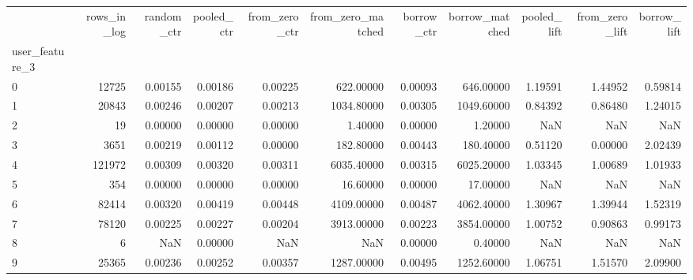 \begin{tabular}{lrrrrrrrrrr}
\toprule
 & rows\_in\_log & random\_ctr & pooled\_ctr & from\_zero\_ctr & from\_zero\_matched & borrow\_ctr & borrow\_matched & pooled\_lift & from\_zero\_lift & borrow\_lift \\
user\_feature\_3 &  &  &  &  &  &  &  &  &  &  \\
\midrule
0 & 12725 & 0.00155 & 0.00186 & 0.00225 & 622.00000 & 0.00093 & 646.00000 & 1.19591 & 1.44952 & 0.59814 \\
1 & 20843 & 0.00246 & 0.00207 & 0.00213 & 1034.80000 & 0.00305 & 1049.60000 & 0.84392 & 0.86480 & 1.24015 \\
2 & 19 & 0.00000 & 0.00000 & 0.00000 & 1.40000 & 0.00000 & 1.20000 & NaN & NaN & NaN \\
3 & 3651 & 0.00219 & 0.00112 & 0.00000 & 182.80000 & 0.00443 & 180.40000 & 0.51120 & 0.00000 & 2.02439 \\
4 & 121972 & 0.00309 & 0.00320 & 0.00311 & 6035.40000 & 0.00315 & 6025.20000 & 1.03345 & 1.00689 & 1.01933 \\
5 & 354 & 0.00000 & 0.00000 & 0.00000 & 16.60000 & 0.00000 & 17.00000 & NaN & NaN & NaN \\
6 & 82414 & 0.00320 & 0.00419 & 0.00448 & 4109.00000 & 0.00487 & 4062.40000 & 1.30967 & 1.39944 & 1.52319 \\
7 & 78120 & 0.00225 & 0.00227 & 0.00204 & 3913.00000 & 0.00223 & 3854.00000 & 1.00752 & 0.90863 & 0.99173 \\
8 & 6 & NaN & 0.00000 & NaN & NaN & 0.00000 & 0.40000 & NaN & NaN & NaN \\
9 & 25365 & 0.00236 & 0.00252 & 0.00357 & 1287.00000 & 0.00495 & 1252.60000 & 1.06751 & 1.51570 & 2.09900 \\
\bottomrule
\end{tabular}
